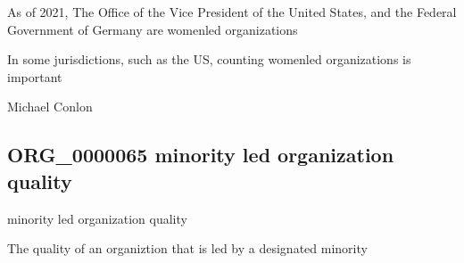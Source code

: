 \documentclass[letterpaper,10pt,english]{sphinxmanual}
\begin{document}
\begin{sphinxShadowBox}

\sphinxAtStartPar
As of 2021, The Office of the Vice President of the United States, and the Federal Government of Germany are women\sphinxhyphen{}led organizations
\end{sphinxShadowBox}

\begin{sphinxShadowBox}

\sphinxAtStartPar
In some jurisdictions, such as the US, counting women\sphinxhyphen{}led organizations is important
\end{sphinxShadowBox}

\begin{sphinxShadowBox}

\sphinxAtStartPar
Michael Conlon 
\end{sphinxShadowBox}
\begin{quote}

\ignorespaces \end{quote}


\subsection{ORG\_0000065 \sphinxhyphen{} minority led organization quality}
\label{\detokenize{doc-ORG_0000065:org-0000065-minority-led-organization-quality}}\label{\detokenize{doc-ORG_0000065:index-0}}\label{\detokenize{doc-ORG_0000065::doc}}
\begin{sphinxShadowBox}

\sphinxAtStartPar
minority led organization quality
\end{sphinxShadowBox}

\begin{sphinxShadowBox}

\sphinxAtStartPar
{\hyperref[\detokenize{doc-BFO_0000019::doc}]{}}
\end{sphinxShadowBox}

\begin{sphinxShadowBox}

\sphinxAtStartPar
The quality of an organiztion that is led by a designated minority
\end{sphinxShadowBox}
\end{document}
